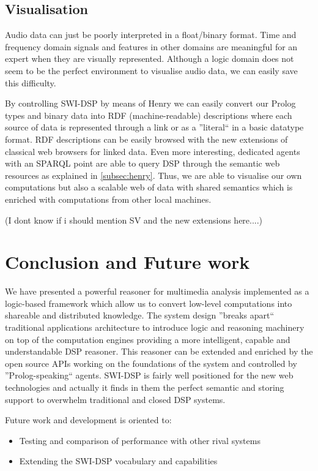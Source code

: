 \documentclass[runningheads]{llncs}
\begin{document}
\subsection{Visualisation}\label{subsec:vis}

Audio data can just be poorly interpreted in a float/binary format. Time and frequency domain signals and features in other domains are meaningful for an expert when they are visually represented. Although a logic domain does not seem to be the perfect environment to visualise audio data, we can easily save this difficulty. 

By controlling SWI-DSP by means of Henry we can easily convert our Prolog types and binary data into RDF (machine-readable) descriptions where each source of data is represented through a link or as a ''literal`` in a basic datatype format. RDF descriptions can be easily browsed with the new extensions of classical web browsers for linked data. Even more interesting, dedicated agents with an SPARQL point are able to query DSP through the semantic web resources as explained in \ref{subsec:henry}. Thus, we are able to visualise our own computations but also a scalable web of data with shared semantics which is enriched with computations from other local machines.

(I dont know if i should mention SV and the new extensions here....)

\section{Conclusion and Future work}\label{sec:conclusion}

We have presented a powerful reasoner for multimedia analysis implemented as a logic-based framework which allow us to convert low-level computations into shareable and distributed knowledge. The system design ''breaks apart`` traditional applications architecture to introduce logic and reasoning machinery on top of the computation engines providing a more intelligent, capable and understandable DSP reasoner. This reasoner can be extended and enriched by the open source APIs working on the foundations of the system and controlled by ''Prolog-speaking`` agents. SWI-DSP is fairly well positioned for the new web technologies and actually it finds in them the perfect semantic and storing support to overwhelm traditional and closed DSP systems.

Future work and development is oriented to:

\begin{itemize}
 \item Testing and comparison of performance with other rival systems
 \item Extending the SWI-DSP vocabulary and capabilities
\end{itemize}
\end{document}
